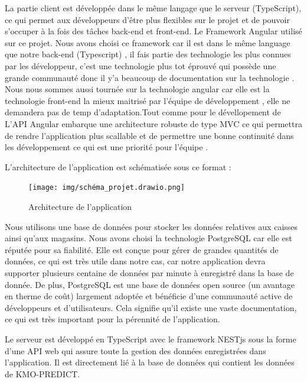 \documentclass[12pt]{article}
\begin{document}
\justify
\text La partie client est développée dans le même langage que le serveur (TypeScript), ce qui permet aux développeurs d'être plus flexibles sur le projet et de pouvoir s'occuper à la fois des tâches back-end et front-end. Le Framework Angular utilisé sur ce projet.
Nous avons choisi ce framework car il est dans le même language que notre back-end (Typescript) , il fais partie des technologie les plus connues par les développeur, c'est une technologie plus tot éprouvé qui possède une grande communauté donc il y'a beaucoup de documentation sur la technologie . Nous nous sommes aussi tournée sur la technologie angular car elle est la technologie front-end la mieux maitrisé par l'équipe de développement , elle ne demandera pas de temp d'adaptation.Tout comme pour le dévellopement de L'API Angular embarque une architecture robuste de type MVC ce qui permettra de rendre l'application plus scallable et de permettre une bonne continuité dans les développement ce qui est une priorité pour l'équipe . 
\justify
\text

\justify
\text L'architecture de l'application est schématisée sous ce format :
\begin{figure}[H]
    \centering
    \texttt{[image: img/schéma\_projet.drawio.png]}
    \caption{Architecture de l'application}
    \label{fig:enter-label}
\end{figure}


\justify
\text Nous utilisons une base de données pour stocker les données relatives aux caisses ainsi qu'aux magasins. Nous avons choisi la technologie PostgreSQL car elle est réputée pour sa fiabilité. Elle est conçue pour gérer de grandes quantités de données, ce qui est très utile dans notre cas, car notre application devra supporter plusieurs centaine de données par minute à enregistré dans la base de donnée. De plus, PostgreSQL est une base de données open source (un avantage en therme de coût) largement adoptée et bénéficie d'une communauté active de développeurs et d'utilisateurs. Cela signifie qu'il existe une vaste documentation, ce qui est très important pour la pérennité de l'application.

\justify
\text Le serveur est développé en TypeScript avec le framework NESTjs sous la forme d'une API web qui assure toute la gestion des données enregistrées dans l'application. Il est directement lié à la base de données qui contient les données de KMO-PREDICT.
\end{document}
